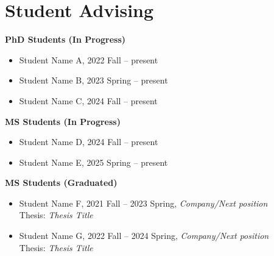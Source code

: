 \section{Student Advising}

\noindent\textbf{PhD Students (In Progress)}
\begin{itemize}
  \item Student Name A, 2022 Fall -- present
  \item Student Name B, 2023 Spring -- present
  \item Student Name C, 2024 Fall -- present
\end{itemize}

\noindent\textbf{MS Students (In Progress)}
\begin{itemize}
  \item Student Name D, 2024 Fall -- present
  \item Student Name E, 2025 Spring -- present
\end{itemize}

\noindent\textbf{MS Students (Graduated)}
\begin{itemize}
  \item Student Name F, 2021 Fall -- 2023 Spring, \textit{Company/Next position}\\
        Thesis: \textit{Thesis Title}
  \item Student Name G, 2022 Fall -- 2024 Spring, \textit{Company/Next position}\\
        Thesis: \textit{Thesis Title}
\end{itemize}
